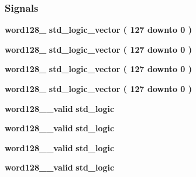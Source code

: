 \subsubsection*{Signals}
 \begin{DoxyCompactItemize}
\item 
{\bf word128\+\_} {\bfseries \textcolor{comment}{std\+\_\+logic\+\_\+vector}\textcolor{vhdlchar}{ }\textcolor{vhdlchar}{(}\textcolor{vhdlchar}{ }\textcolor{vhdlchar}{ } \textcolor{vhdldigit}{127} \textcolor{vhdlchar}{ }\textcolor{keywordflow}{downto}\textcolor{vhdlchar}{ }\textcolor{vhdlchar}{ } \textcolor{vhdldigit}{0} \textcolor{vhdlchar}{ }\textcolor{vhdlchar}{)}\textcolor{vhdlchar}{ }} 
\item 
{\bf word128\+\_} {\bfseries \textcolor{comment}{std\+\_\+logic\+\_\+vector}\textcolor{vhdlchar}{ }\textcolor{vhdlchar}{(}\textcolor{vhdlchar}{ }\textcolor{vhdlchar}{ } \textcolor{vhdldigit}{127} \textcolor{vhdlchar}{ }\textcolor{keywordflow}{downto}\textcolor{vhdlchar}{ }\textcolor{vhdlchar}{ } \textcolor{vhdldigit}{0} \textcolor{vhdlchar}{ }\textcolor{vhdlchar}{)}\textcolor{vhdlchar}{ }} 
\item 
{\bf word128\+\_} {\bfseries \textcolor{comment}{std\+\_\+logic\+\_\+vector}\textcolor{vhdlchar}{ }\textcolor{vhdlchar}{(}\textcolor{vhdlchar}{ }\textcolor{vhdlchar}{ } \textcolor{vhdldigit}{127} \textcolor{vhdlchar}{ }\textcolor{keywordflow}{downto}\textcolor{vhdlchar}{ }\textcolor{vhdlchar}{ } \textcolor{vhdldigit}{0} \textcolor{vhdlchar}{ }\textcolor{vhdlchar}{)}\textcolor{vhdlchar}{ }} 
\item 
{\bf word128\+\_} {\bfseries \textcolor{comment}{std\+\_\+logic\+\_\+vector}\textcolor{vhdlchar}{ }\textcolor{vhdlchar}{(}\textcolor{vhdlchar}{ }\textcolor{vhdlchar}{ } \textcolor{vhdldigit}{127} \textcolor{vhdlchar}{ }\textcolor{keywordflow}{downto}\textcolor{vhdlchar}{ }\textcolor{vhdlchar}{ } \textcolor{vhdldigit}{0} \textcolor{vhdlchar}{ }\textcolor{vhdlchar}{)}\textcolor{vhdlchar}{ }} 
\item 
{\bf word128\+\_\+\_\+valid} {\bfseries \textcolor{comment}{std\+\_\+logic}\textcolor{vhdlchar}{ }} 
\item 
{\bf word128\+\_\+\_\+valid} {\bfseries \textcolor{comment}{std\+\_\+logic}\textcolor{vhdlchar}{ }} 
\item 
{\bf word128\+\_\+\_\+valid} {\bfseries \textcolor{comment}{std\+\_\+logic}\textcolor{vhdlchar}{ }} 
\item 
{\bf word128\+\_\+\_\+valid} {\bfseries \textcolor{comment}{std\+\_\+logic}\textcolor{vhdlchar}{ }} 

\end{DoxyCompactItemize}
